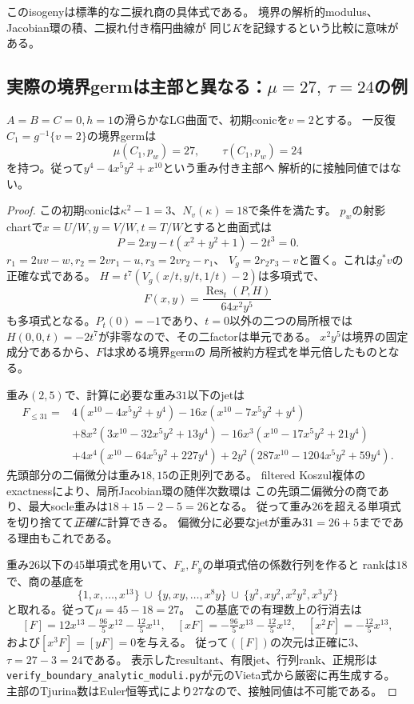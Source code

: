 このisogenyは標準的な二捩れ商の具体式である。
境界の解析的modulus、Jacobian環の積、二捩れ付き楕円曲線が
同じ$K$を記録するという比較に意味がある。

\subsection{実際の境界germは主部と異なる：\texorpdfstring{$\mu=27,\ \tau=24$}{μ=27, τ=24}の例}
\begin{proposition}[一反復ですでに生じる高重み情報]
\label{prop:actual-boundary-tjurina-defect}
$A=B=C=0,h=1$の滑らかなLG曲面で、初期conicを$v=2$とする。
一反復$C_1=g^{-1}\{v=2\}$の境界germは
\[
 \mu(C_1,p_w)=27,\qquad \tau(C_1,p_w)=24
\]
を持つ。従って$y^4-4x^5y^2+x^{10}$という重み付き主部へ
解析的に接触同値ではない。
\end{proposition}
\begin{proof}
この初期conicは$\kappa^2-1=3$、$N_v(\kappa)=18$で条件を満たす。
$p_w$の射影chartで$x=U/W,y=V/W,t=T/W$とすると曲面式は
\[
 P=2xy-t(x^2+y^2+1)-2t^3=0.
\]
$r_1=2uv-w,r_2=2vr_1-u,r_3=2vr_2-r_1$、
$V_g=2r_2r_3-v$と置く。これは$g^*v$の正確な式である。
$H=t^7(V_g(x/t,y/t,1/t)-2)$は多項式で、
\[
 F(x,y)=\frac{\operatorname{Res}_t(P,H)}{64x^2y^5}
\]
も多項式となる。$P_t(0)=-1$であり、$t=0$以外の二つの局所根では
$H(0,0,t)=-2t^7$が非零なので、その二factorは単元である。
$x^2y^5$は境界の固定成分であるから、$F$は求める境界germの
局所被約方程式を単元倍したものとなる。

重み$(2,5)$で、計算に必要な重み$31$以下のjetは
\begin{align*}
 F_{\le31}={}&4(x^{10}-4x^5y^2+y^4)
 -16x(x^{10}-7x^5y^2+y^4)\\
 &+8x^2(3x^{10}-32x^5y^2+13y^4)
 -16x^3(x^{10}-17x^5y^2+21y^4)\\
 &+4x^4(x^{10}-64x^5y^2+227y^4)
 +2y^2(287x^{10}-1204x^5y^2+59y^4).
\end{align*}
先頭部分の二偏微分は重み$18,15$の正則列である。
filtered Koszul複体のexactnessにより、局所Jacobian環の随伴次数環は
この先頭二偏微分の商であり、最大socle重みは$18+15-2-5=26$となる。
従って重み$26$を超える単項式を切り捨てて\emph{正確に}計算できる。
偏微分に必要なjetが重み$31=26+5$までである理由もこれである。

重み$26$以下の45単項式を用いて、$F_x,F_y$の単項式倍の係数行列を作ると
rankは$18$で、商の基底を
\[
 \{1,x,\ldots,x^{13}\}\ \cup\
 \{y,xy,\ldots,x^8y\}\ \cup\
 \{y^2,xy^2,x^2y^2,x^3y^2\}
\]
と取れる。従って$\mu=45-18=27$。
この基底での有理数上の行消去は
\[
 [F]=12x^{13}-\tfrac{96}{5}x^{12}-\tfrac{12}{5}x^{11},\quad
 [xF]=-\tfrac{96}{5}x^{13}-\tfrac{12}{5}x^{12},\quad
 [x^2F]=-\tfrac{12}{5}x^{13},
\]
および$[x^3F]=[yF]=0$を与える。
従って$([F])$の次元は正確に3、$\tau=27-3=24$である。
表示したresultant、有限jet、行列rank、正規形は
\texttt{verify\_boundary\_analytic\_moduli.py}が元のVieta式から厳密に再生成する。
主部のTjurina数はEuler恒等式により$27$なので、接触同値は不可能である。
\end{proof}

